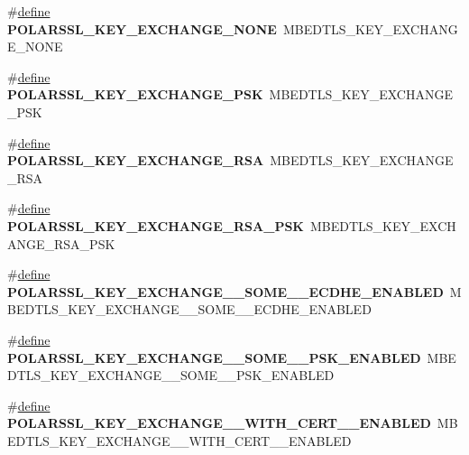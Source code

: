 \begin{DoxyCompactItemize}
\#\hyperlink{structdefine}{define} {\bfseries P\+O\+L\+A\+R\+S\+S\+L\+\_\+\+K\+E\+Y\+\_\+\+E\+X\+C\+H\+A\+N\+G\+E\+\_\+\+N\+O\+NE}~M\+B\+E\+D\+T\+L\+S\+\_\+\+K\+E\+Y\+\_\+\+E\+X\+C\+H\+A\+N\+G\+E\+\_\+\+N\+O\+NE
\item 
\mbox{\label{compat-1_83_8h_aaa34ecd8b8160a7e02ad2a041bd0b413}} 
\#\hyperlink{structdefine}{define} {\bfseries P\+O\+L\+A\+R\+S\+S\+L\+\_\+\+K\+E\+Y\+\_\+\+E\+X\+C\+H\+A\+N\+G\+E\+\_\+\+P\+SK}~M\+B\+E\+D\+T\+L\+S\+\_\+\+K\+E\+Y\+\_\+\+E\+X\+C\+H\+A\+N\+G\+E\+\_\+\+P\+SK
\item 
\mbox{\label{compat-1_83_8h_a775c8acc2f0c6ebc3fcaeea72fa80c2a}} 
\#\hyperlink{structdefine}{define} {\bfseries P\+O\+L\+A\+R\+S\+S\+L\+\_\+\+K\+E\+Y\+\_\+\+E\+X\+C\+H\+A\+N\+G\+E\+\_\+\+R\+SA}~M\+B\+E\+D\+T\+L\+S\+\_\+\+K\+E\+Y\+\_\+\+E\+X\+C\+H\+A\+N\+G\+E\+\_\+\+R\+SA
\item 
\mbox{\label{compat-1_83_8h_aa5bfc59ecf6d4f1098c01bb505a0cbf0}} 
\#\hyperlink{structdefine}{define} {\bfseries P\+O\+L\+A\+R\+S\+S\+L\+\_\+\+K\+E\+Y\+\_\+\+E\+X\+C\+H\+A\+N\+G\+E\+\_\+\+R\+S\+A\+\_\+\+P\+SK}~M\+B\+E\+D\+T\+L\+S\+\_\+\+K\+E\+Y\+\_\+\+E\+X\+C\+H\+A\+N\+G\+E\+\_\+\+R\+S\+A\+\_\+\+P\+SK
\item 
\mbox{\label{compat-1_83_8h_a866cdf579717ed3480366ce9afc93d8b}} 
\#\hyperlink{structdefine}{define} {\bfseries P\+O\+L\+A\+R\+S\+S\+L\+\_\+\+K\+E\+Y\+\_\+\+E\+X\+C\+H\+A\+N\+G\+E\+\_\+\+\_\+\+S\+O\+M\+E\+\_\+\+\_\+\+E\+C\+D\+H\+E\+\_\+\+E\+N\+A\+B\+L\+ED}~M\+B\+E\+D\+T\+L\+S\+\_\+\+K\+E\+Y\+\_\+\+E\+X\+C\+H\+A\+N\+G\+E\+\_\+\+\_\+\+S\+O\+M\+E\+\_\+\+\_\+\+E\+C\+D\+H\+E\+\_\+\+E\+N\+A\+B\+L\+ED
\item 
\mbox{\label{compat-1_83_8h_a1043bbbffe63041fc0ba8755ed4c7d98}} 
\#\hyperlink{structdefine}{define} {\bfseries P\+O\+L\+A\+R\+S\+S\+L\+\_\+\+K\+E\+Y\+\_\+\+E\+X\+C\+H\+A\+N\+G\+E\+\_\+\+\_\+\+S\+O\+M\+E\+\_\+\+\_\+\+P\+S\+K\+\_\+\+E\+N\+A\+B\+L\+ED}~M\+B\+E\+D\+T\+L\+S\+\_\+\+K\+E\+Y\+\_\+\+E\+X\+C\+H\+A\+N\+G\+E\+\_\+\+\_\+\+S\+O\+M\+E\+\_\+\+\_\+\+P\+S\+K\+\_\+\+E\+N\+A\+B\+L\+ED
\item 
\mbox{\label{compat-1_83_8h_ab01d7456e7fb60ef9d335589b643afc0}} 
\#\hyperlink{structdefine}{define} {\bfseries P\+O\+L\+A\+R\+S\+S\+L\+\_\+\+K\+E\+Y\+\_\+\+E\+X\+C\+H\+A\+N\+G\+E\+\_\+\+\_\+\+W\+I\+T\+H\+\_\+\+C\+E\+R\+T\+\_\+\+\_\+\+E\+N\+A\+B\+L\+ED}~M\+B\+E\+D\+T\+L\+S\+\_\+\+K\+E\+Y\+\_\+\+E\+X\+C\+H\+A\+N\+G\+E\+\_\+\+\_\+\+W\+I\+T\+H\+\_\+\+C\+E\+R\+T\+\_\+\+\_\+\+E\+N\+A\+B\+L\+ED

\end{DoxyCompactItemize}
